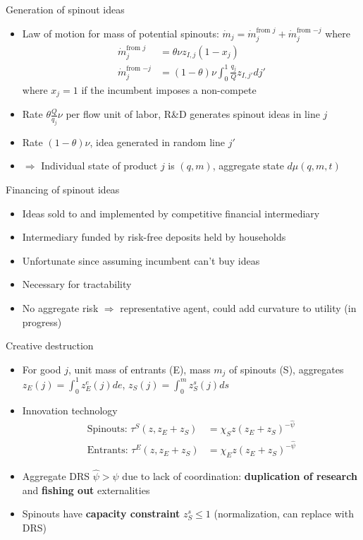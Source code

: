 \documentclass[english,usenames,dvipsnames]{beamer}
\begin{document}
\begin{frame}{Generation of spinout ideas}
\begin{itemize}
\item Law of motion for mass of potential spinouts: $\dot{m}_j = \dot{m}_j^{\textrm{from $j$}} + \dot{m}_j^{\textrm{from $-j$}}$ where
\begin{align*}
\dot{m}_j^{\textrm{from $j$}}&= \theta \nu z_{I,j} (1-x_j)\\
\dot{m}_j^{\textrm{from $-j$}} &= (1-\theta)\nu \int_0^1 \frac{q_j}{Q} z_{I,j'} dj'
\end{align*}
where $x_j = 1$ if the incumbent imposes a non-compete
\item Rate $\theta \frac{Q}{q_j} \nu$ per flow unit of labor, R\&D generates spinout ideas in line $j$
\item Rate $(1-\theta) \nu$, idea generated in random line $j'$
\item $\Rightarrow$ Individual state of product $j$ is $(q,m)$, aggregate state $d\mu(q,m,t)$
\end{itemize}
\end{frame}

\begin{frame}{Financing of spinout ideas}
\begin{itemize}
	\item Ideas sold to and implemented by competitive financial intermediary
	\item Intermediary funded by risk-free deposits held by households
	\item Unfortunate since assuming incumbent can't buy ideas 
	\item Necessary for tractability
	\item No aggregate risk $\Rightarrow$ representative agent, could add curvature to utility (in progress)
\end{itemize}
\end{frame}

\begin{frame}{Creative destruction}
\begin{itemize}
\item For good $j$, unit mass of entrants (E), mass $m_j$ of spinouts (S), aggregates $z_E(j) = \int_0^1 z_E^e(j) de$, $z_S(j) = \int_0^{m} z_S^s(j) ds$
\item Innovation technology
\begin{align*}
\textrm{Spinouts: }\tau^S(z,z_E+z_S) &= \chi_{S} z (z_E + z_S)^{-\hat{\psi}} \\
\textrm{Entrants: }\tau^E(z,z_E+z_S) &= \chi_{E} z (z_E + z_S)^{-\hat{\psi}}
\end{align*}
\item Aggregate DRS $\hat{\psi} > \psi$ due to lack of coordination: \textbf{\alert{duplication of research}} and \textbf{\alert{fishing out}} externalities
\item Spinouts have \textbf{\alert{capacity constraint}} $z_S^s \le 1$ (normalization, can replace with DRS)
\end{itemize}
\end{frame}
\end{document}
